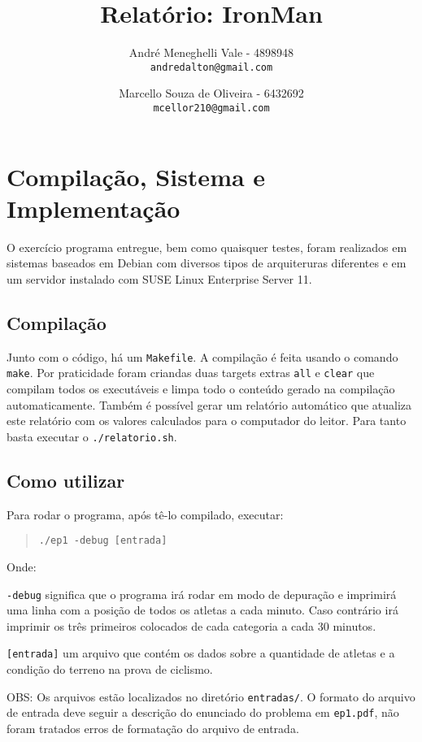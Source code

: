 \documentclass[12pt,a4paper]{article}
\author{
    André Meneghelli Vale - 4898948\\
    \texttt{andredalton@gmail.com}
    \and
    Marcello Souza de Oliveira - 6432692\\
    \texttt{mcellor210@gmail.com}
}
\title{Relatório: IronMan}
\begin{document}
\maketitle

\section{Compilação, Sistema e Implementação}
O exercício programa entregue, bem como quaisquer testes, foram realizados em sistemas baseados em Debian com diversos tipos de arquiteruras diferentes e em um servidor instalado com SUSE Linux Enterprise Server 11.

\subsection{Compilação}
Junto com o código, há um \verb+Makefile+. A compilação é feita usando o 
comando \verb+make+. Por praticidade foram criandas duas targets extras \verb+all+ e \verb+clear+ que compilam todos os executáveis e limpa todo o conteúdo gerado na compilação automaticamente. Também é possível gerar um relatório automático que atualiza este relatório com os valores calculados para o computador do leitor. Para tanto basta executar o \verb+./relatorio.sh+.

\subsection{Como utilizar}
Para rodar o programa, após tê-lo compilado, executar:
\begin{quote}
\begin{verbatim}
./ep1 -debug [entrada]
\end{verbatim}
\end{quote}

Onde:

\verb+-debug+ significa que o programa irá rodar em modo de depuração e imprimirá uma linha com a posição de todos os atletas a cada minuto. Caso contrário irá imprimir os três primeiros colocados de cada categoria a cada 30 minutos.

\verb+[entrada]+ um arquivo que contém os dados sobre a quantidade de atletas e a condição do terreno na prova de ciclismo.

OBS: Os arquivos estão localizados no diretório \verb+entradas/+. O formato do arquivo de entrada deve seguir a descrição do enunciado do problema em \verb+ep1.pdf+, não foram tratados erros de formatação do arquivo de entrada.
\end{document}
